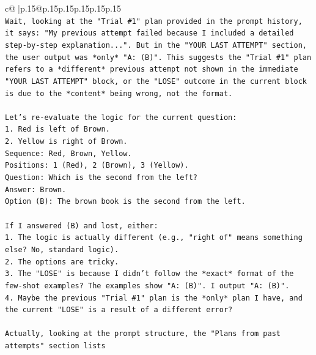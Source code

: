 \documentclass{article}
\begin{document}
{\begin{supertabular}{c@{$\;$}|p{.15\linewidth}@{}p{.15\linewidth}p{.15\linewidth}p{.15\linewidth}p{.15\linewidth}p{.15\linewidth}}
{{{\\ 
\texttt{Wait, looking at the "Trial \#1" plan provided in the prompt history, it says: "My previous attempt failed because I included a detailed step{-}by{-}step explanation...". But in the "YOUR LAST ATTEMPT" section, the user output was *only* "A: (B)". This suggests the "Trial \#1" plan refers to a *different* previous attempt not shown in the immediate "YOUR LAST ATTEMPT" block, or the "LOSE" outcome in the current block is due to the *content* being wrong, not the format.} \\
\\ 
\texttt{Let's re{-}evaluate the logic for the current question:} \\
\texttt{1. Red is left of Brown.} \\
\texttt{2. Yellow is right of Brown.} \\
\texttt{Sequence: Red, Brown, Yellow.} \\
\texttt{Positions: 1 (Red), 2 (Brown), 3 (Yellow).} \\
\texttt{Question: Which is the second from the left?} \\
\texttt{Answer: Brown.} \\
\texttt{Option (B): The brown book is the second from the left.} \\
\\ 
\texttt{If I answered (B) and lost, either:} \\
\texttt{1. The logic is actually different (e.g., "right of" means something else? No, standard logic).} \\
\texttt{2. The options are tricky.} \\
\texttt{3. The "LOSE" is because I didn't follow the *exact* format of the few{-}shot examples? The examples show "A: (B)". I output "A: (B)".} \\
\texttt{4. Maybe the previous "Trial \#1" plan is the *only* plan I have, and the current "LOSE" is a result of a different error?} \\
\\ 
\texttt{Actually, looking at the prompt structure, the "Plans from past attempts" section lists} \\
\\ 
}}}
\end{supertabular}}
\end{document}
